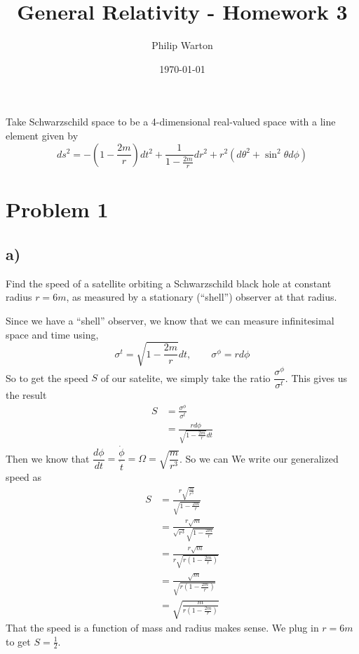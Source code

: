 \documentclass{article}
\theoremstyle{definition}
\begin{document}
\title{General Relativity - Homework 3}
\author{Philip Warton}
\date{\today}
\maketitle
Take Schwarzschild space to be a 4-dimensional real-valued space with a line element given by
\[
    ds^2 = -\left(1-\frac{2m}{r}\right)dt^2 + \frac{1}{1-\frac{2m}{r}}dr^2 + r^2(d\theta^2 + \sin^2 \theta d\phi)
\]
\section*{Problem 1}
    \subsection*{a)}
        \begin{mdframed}
            Find the speed of a satellite orbiting a Schwarzschild black hole at constant radius $r= 6m$, as measured by a stationary (``shell”) observer at that radius.
        \end{mdframed}
        Since we have a ``shell'' observer, we know that we can measure infinitesimal space and time using,
        \[
            \sigma^t = \sqrt{1-\frac{2m}{r}} dt, \ \ \ \ \ \ \ \ \ \sigma^\phi = r d\phi
        \]
        So to get the speed $S$ of our satelite, we simply take the ratio $\dfrac{\sigma^\phi}{\sigma^t}$.
        This gives us the result 
        \begin{align*}
            S & = \frac{\sigma^\phi}{\sigma^t} \\
            &= \frac{rd\phi}{\sqrt{1-\frac{2m}{r}}dt}
        \end{align*}
        Then we know that $\dfrac{d\phi}{dt} = \dfrac{\dot \phi}{\dot t} = \Omega = \sqrt{\dfrac{m}{r^3}}$. So we can
        We write our generalized speed as 
        \begin{align*}
            S &= \frac{r\sqrt{\frac{m}{r^3}}}{\sqrt{1-\frac{2m}{r}}}\\
            &= \frac{r\sqrt{m}}{\sqrt{r^3}\sqrt{1-\frac{2m}{r}}}\\
            &=  \frac{r\sqrt{m}}{r\sqrt{r(1-\frac{2m}{r})}}\\
            &= \frac{\sqrt{m}}{\sqrt{r(1-\frac{2m}{r})}}\\
            &= \sqrt{\frac{m}{r(1- \frac{2m}{r})}}
        \end{align*}
        That the speed is a function of mass and radius makes sense.
        We plug in $r = 6m$ to get $S = \frac{1}{2}$.\\\\\\\\
\end{document}
